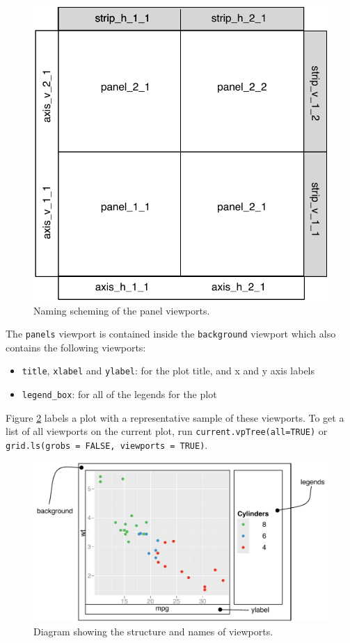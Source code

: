 \begin{figure}[htbp]
  \centering
    \includegraphics[width=0.5 \linewidth]{diagrams/grid-panelvp}
  \caption{Naming scheming of the panel viewports.}
  \label{fig:panelvp}
\end{figure}

The \texttt{panels} viewport is contained inside the \texttt{background}
viewport which also contains the following viewports:

\begin{itemize}
\itemsep1pt\parskip0pt
\item
  \texttt{title}, \texttt{xlabel} and \texttt{ylabel}: for the plot
  title, and x and y axis labels
\item
  \texttt{legend\_box}: for all of the legends for the plot
\end{itemize}

Figure \ref{fig:viewports} labels a plot with a representative sample of
these viewports. To get a list of all viewports on the current plot, run
\texttt{current.vpTree(all=TRUE)} or
\texttt{grid.ls(grobs = FALSE, viewports = TRUE)}.

\begin{figure}[htbp]
  \centering
    \includegraphics[width=\linewidth]{diagrams/grid-viewports}
  \caption{Diagram showing the structure and names of viewports.}
  \label{fig:viewports}
\end{figure}

